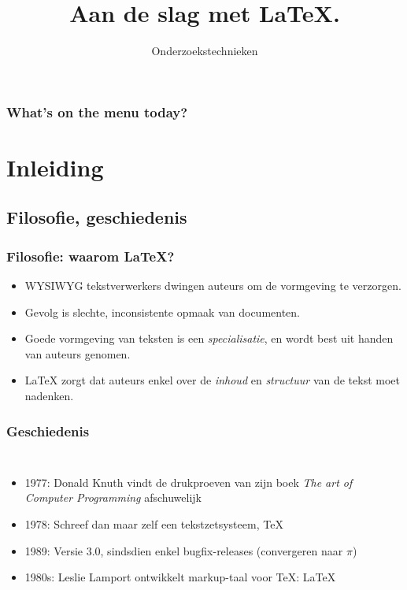 \documentclass[aspectratio=169]{beamer}
\title{Aan de slag met \LaTeX.}
\subtitle{Onderzoekstechnieken}
\begin{document}
\begin{frame}
  \maketitle
\end{frame}

\begin{frame}
  \frametitle{What's on the menu today?}
  
  \tableofcontents
\end{frame}


\section{Inleiding}

\subsection{Filosofie, geschiedenis}

\begin{frame}
  \frametitle{Filosofie: waarom {\LaTeX}?}
  
  \begin{itemize}
    \item<+-> WYSIWYG tekstverwerkers dwingen auteurs om de vormgeving te verzorgen.
    \item<+-> Gevolg is slechte, inconsistente opmaak van documenten.
    \item<+-> Goede vormgeving van teksten is een \emph{specialisatie}, en wordt best
    uit handen van auteurs genomen.
    \item<+-> {\LaTeX} zorgt dat auteurs enkel over de \emph{inhoud} en \emph{structuur} van de tekst moet nadenken.
  \end{itemize}
\end{frame}

\begin{frame}
  \frametitle{Geschiedenis}
  
  \begin{columns}[c]
    
    \begin{itemize}
      \item<+-> 1977: Donald Knuth vindt de drukproeven van zijn boek \emph{The art of Computer Programming} afschuwelijk
      \item<+-> 1978: Schreef dan maar zelf een tekstzetsysteem, {\TeX}
      \item<+-> 1989: Versie 3.0, sindsdien enkel bugfix-releases (convergeren naar $\pi$)
      \item<+-> 1980s: Leslie Lamport ontwikkelt markup-taal voor {\TeX}: {\LaTeX}
    \end{itemize}
    
    \begin{center}
    \end{center}
    
  \end{columns}
\end{frame}
\end{document}
